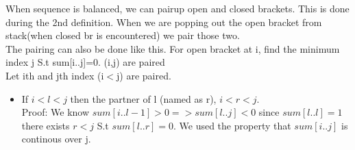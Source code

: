 \documentclass[../Notes.tex]{subfiles}
\begin{document}
When sequence is balanced, we can pairup open and closed brackets. This is done during the 2nd definition. When we are popping out the open bracket from stack(when closed br is encountered) we pair those two.\\

The pairing can also be done like this. For open bracket at i, find the minimum index j S.t sum[i..j]=0. (i,j) are paired\\

Let ith and jth index (i$<$j) are paired.
\begin{itemize}
	\item If $i<l<j$ then the partner of l (named as r), $i<r<j$. \\
	Proof: We know $sum[i..l-1]>0 => sum[l..j]<0$ since $sum[l..l] = 1$ there exists $r<j$ S.t $sum[l..r]=0$. We used the property that $sum[i..j]$ is continous over j.
\end{itemize} 
\end{document}
